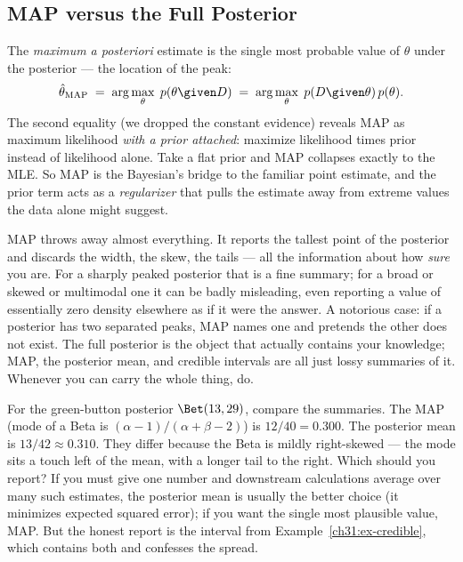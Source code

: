 \subsection{MAP versus the Full Posterior}

The \emph{maximum a posteriori} estimate is the single most probable value of $\theta$
under the posterior --- the location of the peak:
\[
  \hat\theta_{\text{MAP}} \;=\; \arg\max_\theta\; p(\theta\given D)
  \;=\; \arg\max_\theta\; p(D\given\theta)\,p(\theta).
\]
The second equality (we dropped the constant evidence) reveals MAP as maximum likelihood
\emph{with a prior attached}: maximize likelihood times prior instead of likelihood alone.
Take a flat prior and MAP collapses exactly to the MLE. So MAP is the Bayesian's bridge to
the familiar point estimate, and the prior term acts as a \emph{regularizer} that pulls the
estimate away from extreme values the data alone might suggest.

\begin{happeningbox}
MAP throws away almost everything. It reports the tallest point of the posterior and
discards the width, the skew, the tails --- all the information about how \emph{sure} you
are. For a sharply peaked posterior that is a fine summary; for a broad or skewed or
multimodal one it can be badly misleading, even reporting a value of essentially zero
density elsewhere as if it were the answer. A notorious case: if a posterior has two
separated peaks, MAP names one and pretends the other does not exist. The full posterior is
the object that actually contains your knowledge; MAP, the posterior mean, and credible
intervals are all just lossy summaries of it. Whenever you can carry the whole thing, do.
\end{happeningbox}

\begin{walkbox}
For the green-button posterior $\Bet(13,29)$, compare the summaries. The MAP (mode of a
Beta is $(\alpha-1)/(\alpha+\beta-2)$) is $12/40 = 0.300$. The posterior mean is
$13/42 \approx 0.310$. They differ because the Beta is mildly right-skewed --- the mode
sits a touch left of the mean, with a longer tail to the right. Which should you report?
If you must give one number and downstream calculations average over many such estimates,
the posterior mean is usually the better choice (it minimizes expected squared error); if
you want the single most plausible value, MAP. But the honest report is the interval from
Example~\ref{ch31:ex-credible}, which contains both and confesses the spread.
\end{walkbox}

